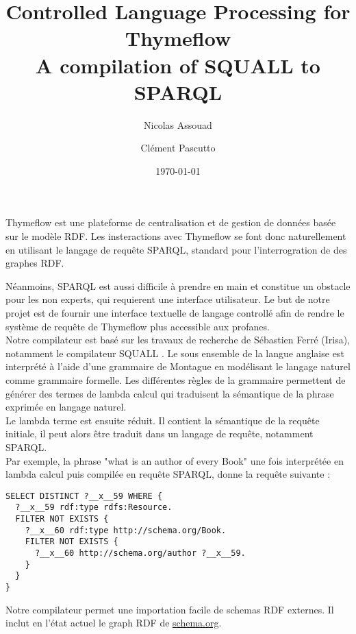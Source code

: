 \documentclass{article}
\author{Nicolas Assouad\and Cl\'ement Pascutto}
\title{Controlled Language Processing for Thymeflow\\A compilation of SQUALL to SPARQL}
\date{\today}
\begin{document}
\maketitle

Thymeflow est une plateforme de centralisation et de gestion de données basée sur le modèle RDF. Les insteractions avec Thymeflow se font donc naturellement en utilisant le langage de requête SPARQL, standard pour l'interrogration de des graphes RDF.

Néanmoins, SPARQL est aussi difficile à prendre en main et constitue un obstacle pour les non experts, qui requierent une interface utilisateur.
Le but de notre projet est de fournir une interface textuelle de langage controllé afin de rendre le système de requête de Thymeflow plus accessible aux profanes.\\


Notre compilateur est basé sur les travaux de recherche de Sébastien Ferré (Irisa), notamment le compilateur SQUALL \cite{ferre:inria-00628427}. Le sous ensemble de la langue anglaise est interprété à l'aide d'une grammaire de Montague en modélisant le langage naturel comme grammaire formelle. Les différentes règles de la grammaire permettent de générer des termes de lambda calcul qui traduisent la sémantique de la phrase exprimée en langage naturel.\\

Le lambda terme est ensuite réduit. Il contient la sémantique de la requête initiale, il peut alors être traduit dans un langage de requête, notamment SPARQL.\\

Par exemple, la phrase "what is an author of every Book" une fois interprétée en lambda calcul puis compilée en requête SPARQL, donne la requête suivante :\\

\begin{lstlisting}
SELECT DISTINCT ?__x__59 WHERE {
  ?__x__59 rdf:type rdfs:Resource.
  FILTER NOT EXISTS {
    ?__x__60 rdf:type http://schema.org/Book.
    FILTER NOT EXISTS {
      ?__x__60 http://schema.org/author ?__x__59.
    }
  }
}
\end{lstlisting}

Notre compilateur permet une importation facile de schemas RDF externes. Il inclut en l'état actuel le graph RDF de \url{schema.org}.\\



\end{document}
